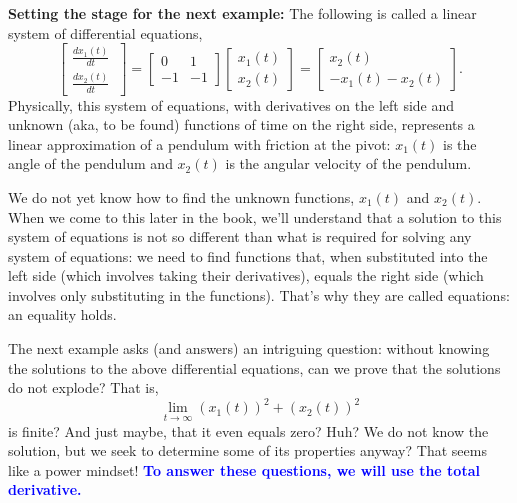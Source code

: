 \textbf{Setting the stage for the next example:} The following is called a linear system of differential equations, 
\begin{equation}
\label{eq:SpecificLinearODE}
\begin{bmatrix}
\frac{d x_1(t)}{dt} \\
\frac{d x_2(t)}{dt} \
\end{bmatrix}
=
\begin{bmatrix}
0 & 1 \\
-1 & -1
\end{bmatrix}
\begin{bmatrix}
x_1(t) \\
x_2(t)
\end{bmatrix} = \begin{bmatrix}
x_2(t) \\
-x_1(t) - x_2(t)
\end{bmatrix}.
\end{equation}
Physically, this system of equations, with derivatives on the left side and unknown (aka, to be found) functions of time on the right side, represents a linear approximation of a pendulum with friction at the pivot: $x_1(t)$ is the angle of the pendulum and $x_2(t)$ is the angular velocity of the pendulum.

We do not yet know how to find the unknown functions, $x_1(t)$ and $x_2(t)$. When we come to this later in the book, we'll understand that a solution to this system of equations is not so different than what is required for solving any system of equations: we need to find functions that, when substituted into the left side (which involves taking their derivatives), equals the right side (which involves only substituting in the functions). That's why they are called equations: an equality holds. 

The next example asks (and answers) an intriguing question: without knowing the solutions to the above differential equations, can we prove that the solutions do not explode? That is, 
\begin{equation}
\label{eq:LimitForSpecificLinearODE}
    \lim_{t \to \infty} \left(x_1(t) \right)^2 + \left(x_2(t) \right)^2
\end{equation}
is finite? And just maybe, that it even equals zero? Huh? We do not know the solution, but we seek to determine some of its properties anyway? That seems like a power mindset! \textcolor{blue}{\bf To answer these questions, we will use the total derivative.} 

\vspace*{.2cm}

